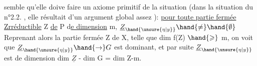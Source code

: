semble qu'elle doive faire un axiome primitif de la situation (dans la
situation du n°2.2. , elle résultait d'un argument global assez  ):
\uline{pour toute partie fermée Zrréductible} Z \uline{de} P d\uline{e dimension} m, $\underline{Z}_{\hand{\unsure{\eta|y}}} \hand{\neq} \hand{\emptyset}$ 
 Reprenant alors la
partie fermée Z de X, telle que dim f(Z) $\hand{\geqslant}$ m, on voit que $\underline{Z}_{\hand{\unsure{\eta|y}}} \hand{\rightarrow} G$ est
dominant, et par suite $\underline{Z}_{\hand{\unsure{\eta|y}}}$ est de dimension dim $\underline{Z}$ - dim G = dim Z-m.

